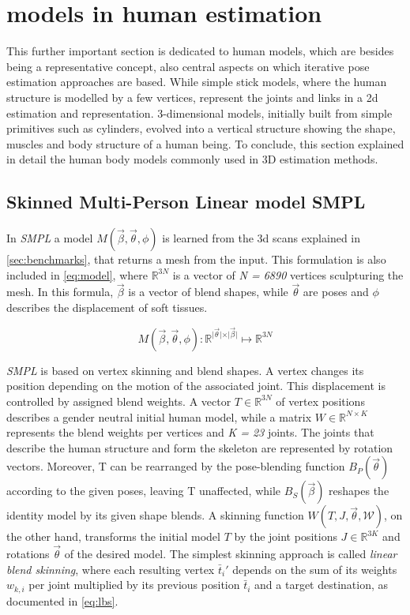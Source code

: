 \section{models in human estimation}
This further important section is dedicated to human models, which are besides being a representative concept, also central aspects on which iterative pose estimation approaches are based. While simple stick models, where the human structure is modelled by a few vertices, represent the joints and links in a 2d estimation and representation. 3-dimensional models, initially built from simple primitives such as cylinders, evolved into a vertical structure showing the shape, muscles and body structure of a human being. To conclude, this section explained in detail the human body models commonly used in 3D estimation methods.

\subsection{Skinned Multi-Person Linear model SMPL}
\label{sec:SMPL}
In \emph{SMPL} a model $M(\vec{\beta},\vec{\theta},\phi)$ is learned from the 3d scans explained in \autoref{sec:benchmarks}, that returns a mesh from the input. This formulation is also included in \autoref{eq:model}, where $\mathbb{R}^{3N}$ is a vector of \emph{N = 6890} vertices sculpturing the mesh. In this formula, $\vec{\beta}$ is a vector of blend shapes, while $\vec{\theta}$ are poses and $\phi$ describes the displacement of soft tissues.

\begin{equation}
\label{eq:model}
M(\vec{\beta},\vec{\theta},\phi) : \mathbb{R}^{\vert \vec{\theta} \vert \times \vert \vec{\beta} \vert} \mapsto \mathbb{R}^{3N}
\end{equation}

\emph{SMPL} is based on vertex skinning and blend shapes. A vertex changes its position depending on the motion of the associated joint. This displacement is controlled by assigned blend weights. A vector $T \in \mathbb{R}^{3N}$ of vertex positions describes a gender neutral initial human model, while a matrix $W \in \mathbb{R}^{N \times K}$ represents the blend weights per vertices and \emph{K = 23} joints. The joints that describe the human structure and form the skeleton are represented by rotation vectors. Moreover, T can be rearranged by the pose-blending function $B_{P}(\vec{\theta})$ according to the given poses, leaving T unaffected, while $B_{S}(\vec{\beta})$ reshapes the identity model by its given shape blends. A skinning function $W(T,J,\vec{\theta},\mathcal{W})$, on the other hand, transforms the initial model $T$ by the joint positions $J \in \mathbb{R}^{3K}$ and rotations $\vec{\theta}$ of the desired model. The simplest skinning approach is called \emph{linear blend skinning}, where each resulting vertex $\bar{t}_{i}'$ depends on the sum of its weights $w_{k,i}$ per joint multiplied by its previous position $\bar{t}_{i}$ and a target destination, as documented in \autoref{eq:lbs}. 

